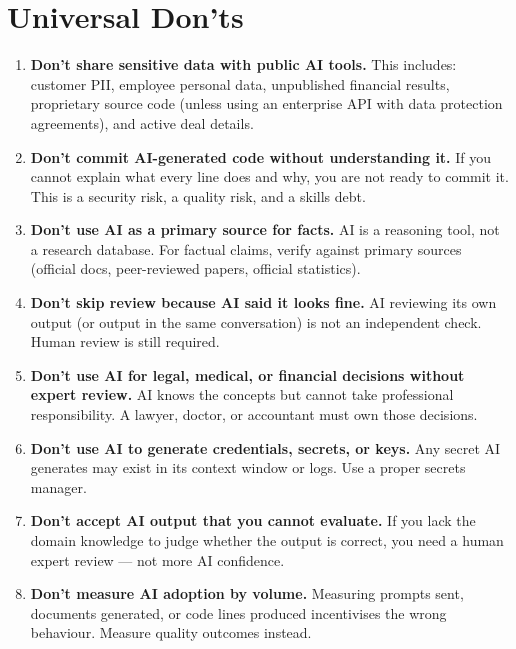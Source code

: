 \section{Universal Don'ts}
\label{sec:donts}

\begin{enumerate}

  \item \textbf{Don't share sensitive data with public AI tools.}
    This includes: customer PII, employee personal data, unpublished financial results,
    proprietary source code (unless using an enterprise API with data protection
    agreements), and active deal details.

  \item \textbf{Don't commit AI-generated code without understanding it.}
    If you cannot explain what every line does and why, you are not ready to commit it.
    This is a security risk, a quality risk, and a skills debt.

  \item \textbf{Don't use AI as a primary source for facts.}
    AI is a reasoning tool, not a research database. For factual claims, verify against
    primary sources (official docs, peer-reviewed papers, official statistics).

  \item \textbf{Don't skip review because AI said it looks fine.}
    AI reviewing its own output (or output in the same conversation) is not an
    independent check. Human review is still required.

  \item \textbf{Don't use AI for legal, medical, or financial decisions without expert review.}
    AI knows the concepts but cannot take professional responsibility. A lawyer,
    doctor, or accountant must own those decisions.

  \item \textbf{Don't use AI to generate credentials, secrets, or keys.}
    Any secret AI generates may exist in its context window or logs.
    Use a proper secrets manager.

  \item \textbf{Don't accept AI output that you cannot evaluate.}
    If you lack the domain knowledge to judge whether the output is correct, you need
    a human expert review --- not more AI confidence.

  \item \textbf{Don't measure AI adoption by volume.}
    Measuring prompts sent, documents generated, or code lines produced incentivises
    the wrong behaviour. Measure quality outcomes instead.


\end{enumerate}
